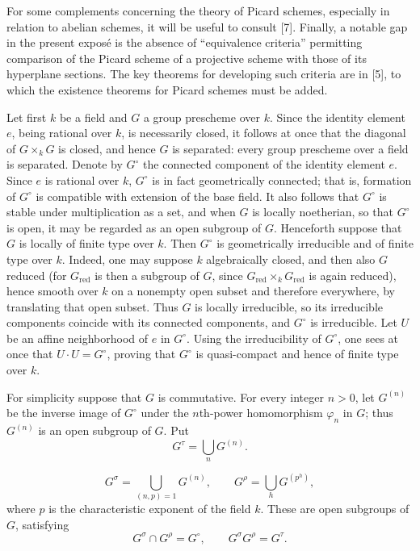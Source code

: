 For some complements concerning the theory of Picard schemes, especially in
relation to abelian schemes, it will be useful to consult [7]. Finally, a
notable gap in the present exposé is the absence of “equivalence criteria”
permitting comparison of the Picard scheme of a projective scheme with those
of its hyperplane sections. The key theorems for developing such criteria are
in [5], to which the existence theorems for Picard schemes must be added.


Let first $k$ be a field and $G$ a group prescheme over $k$. Since the identity
element $e$, being rational over $k$, is necessarily closed, it follows at once
that the diagonal of $G\times_kG$ is closed, and hence $G$ is separated: every
group prescheme over a field is separated. Denote by $G^\circ$ the connected
component of the identity element $e$. Since $e$ is rational over $k$,
$G^\circ$ is in fact geometrically connected; that is, formation of $G^\circ$
is compatible with extension of the base field. It also follows that
$G^\circ$ is stable under multiplication as a set, and when $G$ is locally
noetherian, so that $G^\circ$ is open, it may be regarded as an open subgroup
of $G$. Henceforth suppose that $G$ is locally of finite type over $k$. Then
$G^\circ$ is geometrically irreducible and of finite type over $k$. Indeed,
one may suppose $k$ algebraically closed, and then also $G$ reduced (for
$G_{\mathrm{red}}$ is then a subgroup of $G$, since
$G_{\mathrm{red}}\times_kG_{\mathrm{red}}$ is again reduced), hence smooth
over $k$ on a nonempty open subset and therefore everywhere, by translating
that open subset. Thus $G$ is locally irreducible, so its irreducible
components coincide with its connected components, and $G^\circ$ is
irreducible. Let $U$ be an affine neighborhood of $e$ in $G^\circ$. Using the
irreducibility of $G^\circ$, one sees at once that $U\cdot U=G^\circ$, proving
that $G^\circ$ is quasi-compact and hence of finite type over $k$.

For simplicity suppose that $G$ is commutative. For every integer $n>0$, let
$G^{(n)}$ be the inverse image of $G^\circ$ under the $n$th-power
homomorphism $\varphi_n$ in $G$; thus $G^{(n)}$ is an open subgroup of $G$.
Put
\[
G^\tau=\bigcup_nG^{(n)}.
\]

\[
G^\sigma=\bigcup_{(n,p)=1}G^{(n)},
\qquad
G^\rho=\bigcup_hG^{(p^h)},
\]
where $p$ is the characteristic exponent of the field $k$. These are open
subgroups of $G$, satisfying
\[
G^\sigma\cap G^\rho=G^\circ,
\qquad
G^\sigma G^\rho=G^\tau.
\]

